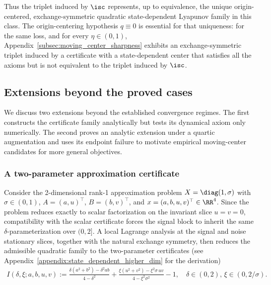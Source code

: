 \documentclass{article}
\begin{document}
Thus the triplet induced by $\isc$ represents, up to equivalence, the unique
origin-centered, exchange-symmetric quadratic state-dependent Lyapunov family
in this class. The origin-centering hypothesis $q\equiv0$ is essential for
that uniqueness: for the same loss, and for every $\eta\in(0,1)$,
Appendix~\ref{subsec:moving_center_sharpness} exhibits an exchange-symmetric
triplet induced by a certificate with a state-dependent center that satisfies
all the axioms but is not equivalent to the triplet induced by $\isc$.

\subsection{Extensions beyond the proved cases}
\label{subsec:extensions_beyond}

We discuss two extensions beyond the established convergence regimes. The
first constructs the certificate family analytically but tests its dynamical
axiom only numerically. The second proves an analytic extension under a
quartic augmentation and uses its endpoint failure to motivate empirical
moving-center candidates for more general objectives.

\subsubsection{A two-parameter approximation certificate}

Consider the 2-dimensional rank-1 approximation problem
$X=\diag(1,\sigma)$ with $\sigma\in(0,1)$, $A=(a,u)^\top$, $B=(b,v)^\top$, and
$x=(a,b,u,v)^\top\in\RR^4$.
Since the problem reduces exactly to scalar factorization on the invariant
slice $u=v=0$, compatibility with the scalar certificate forces the signal
block to inherit the same $\delta$-parameterization over $(0,2]$. A local
Lagrange analysis at the signal and noise stationary slices, together with the
natural exchange symmetry, then reduces the admissible quadratic family to the
two-parameter certificates (see Appendix~\ref{appendix:state_dependent_higher_dim} for the derivation)
\begin{align}
    I(\delta,\xi;a,b,u,v)
    :=
    \frac{\delta(a^2+b^2)-\delta^2 ab}{4-\delta^2}
    +
    \frac{\xi(u^2+v^2)-\xi^2\sigma\,uv}
    {4-\xi^2\sigma^2}
    -1,
    \quad
    \delta\in(0,2),\,\xi\in(0,2/\sigma).
    \label{eq:diag_1_sigma_two_param_certificate}
\end{align}
\end{document}
